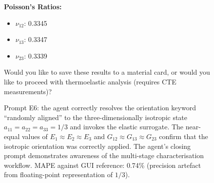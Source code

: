 \documentclass[preprint,review,10pt,number]{elsarticle}
\begin{document}
\begin{figure}[h]
\begin{tcolorbox}
\begin{tcolorbox}
\textbf{Poisson's Ratios:}
\begin{itemize}[leftmargin=1.2em, itemsep=0pt, topsep=2pt]
\item $\nu_{12}$: 0.3345
\item $\nu_{13}$: 0.3347
\item $\nu_{23}$: 0.3339
\end{itemize}
\vspace{4pt}
Would you like to save these results to a material card, or would 
you like to proceed with thermoelastic analysis (requires CTE 
measurements)?
\end{tcolorbox}
\end{tcolorbox}
\caption{Prompt E6: the agent correctly resolves the orientation 
keyword ``randomly aligned'' to the three-dimensionally isotropic 
state $a_{11} = a_{22} = a_{33} = 1/3$ and invokes the elastic 
surrogate. The near-equal values of $E_1 \approx E_2 \approx E_3$ 
and $G_{12} \approx G_{13} \approx G_{23}$ confirm that the 
isotropic orientation was correctly applied. The agent's closing 
prompt demonstrates awareness of the multi-stage characterisation 
workflow. MAPE against GUI reference: 0.74\% (precision artefact 
from floating-point representation of $1/3$).}
\label{fig:e6}
\end{figure}
\end{document}

